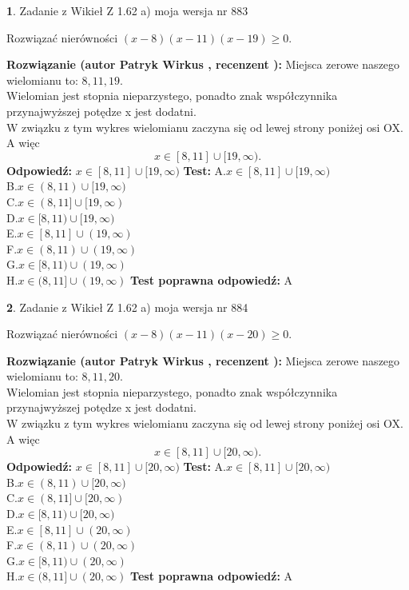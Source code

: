 \documentclass[12pt, a4paper]{article}
\theoremstyle{definition} %
\newtheorem{zad}{}
\newcommand{\zadStart}[1]{\begin{zad}#1\newline}
\newcommand{\zadStop}{\end{zad}}
\newcommand{\rozwStart}[2]{\noindent \textbf{Rozwiązanie (autor #1 , recenzent #2): }\newline}
\newcommand{\rozwStop}{\newline}
\newcommand{\odpStart}{\noindent \textbf{Odpowiedź:}\newline}
\newcommand{\odpStop}{\newline}
\newcommand{\testStart}{\noindent \textbf{Test:}\newline}
\newcommand{\testStop}{\newline}
\newcommand{\kluczStart}{\noindent \textbf{Test poprawna odpowiedź:}\newline}
\newcommand{\kluczStop}{\newline}
\begin{document}
\zadStart{Zadanie z Wikieł Z 1.62 a) moja wersja nr 883}

Rozwiązać nierówności $(x-8)(x-11)(x-19)\ge0$.
\zadStop
\rozwStart{Patryk Wirkus}{}
Miejsca zerowe naszego wielomianu to: $8, 11, 19$.\\
Wielomian jest stopnia nieparzystego, ponadto znak współczynnika przy\linebreak najwyższej potędze x jest dodatni.\\ W związku z tym wykres wielomianu zaczyna się od lewej strony poniżej osi OX. A więc $$x \in [8,11] \cup [19,\infty).$$
\rozwStop
\odpStart
$x \in [8,11] \cup [19,\infty)$
\odpStop
\testStart
A.$x \in [8,11] \cup [19,\infty)$\\
B.$x \in (8,11) \cup [19,\infty)$\\
C.$x \in (8,11] \cup [19,\infty)$\\
D.$x \in [8,11) \cup [19,\infty)$\\
E.$x \in [8,11] \cup (19,\infty)$\\
F.$x \in (8,11) \cup (19,\infty)$\\
G.$x \in [8,11) \cup (19,\infty)$\\
H.$x \in (8,11] \cup (19,\infty)$
\testStop
\kluczStart
A
\kluczStop



\zadStart{Zadanie z Wikieł Z 1.62 a) moja wersja nr 884}

Rozwiązać nierówności $(x-8)(x-11)(x-20)\ge0$.
\zadStop
\rozwStart{Patryk Wirkus}{}
Miejsca zerowe naszego wielomianu to: $8, 11, 20$.\\
Wielomian jest stopnia nieparzystego, ponadto znak współczynnika przy\linebreak najwyższej potędze x jest dodatni.\\ W związku z tym wykres wielomianu zaczyna się od lewej strony poniżej osi OX. A więc $$x \in [8,11] \cup [20,\infty).$$
\rozwStop
\odpStart
$x \in [8,11] \cup [20,\infty)$
\odpStop
\testStart
A.$x \in [8,11] \cup [20,\infty)$\\
B.$x \in (8,11) \cup [20,\infty)$\\
C.$x \in (8,11] \cup [20,\infty)$\\
D.$x \in [8,11) \cup [20,\infty)$\\
E.$x \in [8,11] \cup (20,\infty)$\\
F.$x \in (8,11) \cup (20,\infty)$\\
G.$x \in [8,11) \cup (20,\infty)$\\
H.$x \in (8,11] \cup (20,\infty)$
\testStop
\kluczStart
A
\kluczStop
\end{document}
